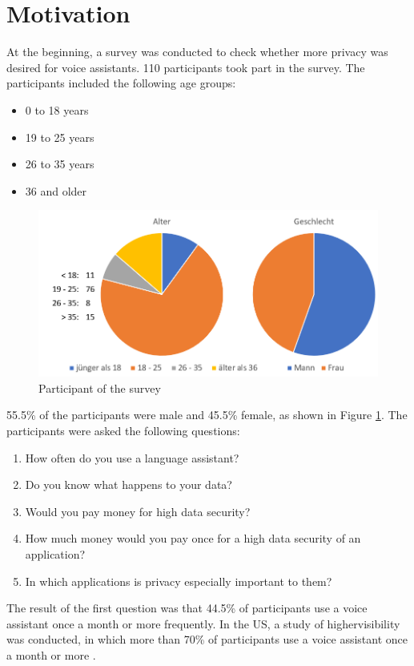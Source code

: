 \section{Motivation}\label{sec:motivaiton}
At the beginning, a survey was conducted to check whether more privacy was desired for voice assistants. 110 participants took part in the survey. The participants included the following age groups:
\begin{itemize}
	\item 0 to 18 years 
	\item 19 to 25 years
	\item 26 to 35 years
	\item 36 and older	
\end{itemize}

\begin{figure}[h]
	\centering
	\includegraphics[width=0.9\linewidth]{Picture/umfrage_teilnehmer}
	\caption[Participant of the survey]{Participant of the survey}
	\label{fig:umfrage_teilnehmer}
\end{figure}

55.5\% of the participants were male and 45.5\% female, as shown in Figure \ref{fig:umfrage_teilnehmer}. The participants were asked the following questions:

\begin{enumerate}	
	\item How often do you use a language assistant?
	\item Do you know what happens to your data?
	\item Would you pay money for high data security?
	\item How much money would you pay once for a high data security of an application?
	\item In which applications is privacy especially important to them?
\end{enumerate}

The result of the first question was that 44.5\% of participants use a voice assistant once a month or more frequently. In the US, a study of \glqq highervisibility\grqq{} was conducted, in which more than 70\% of participants use a voice assistant once a month or more \cite{highervisibility}.


